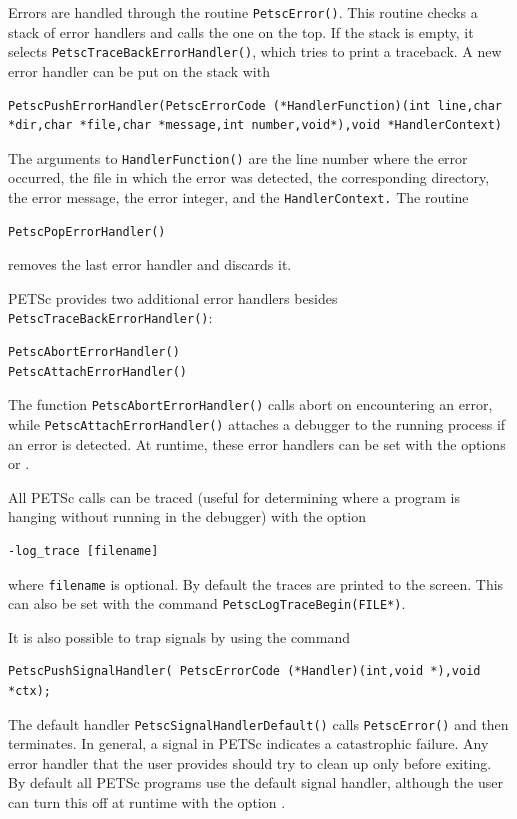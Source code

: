 {{{Errors are handled through the routine \lstinline{PetscError()}.
This routine
checks a stack of error handlers and calls the one on the top.
If the stack is empty, it selects \lstinline{PetscTraceBackErrorHandler()},
which tries to print a traceback.
A new error handler can be put on the stack with
\begin{lstlisting}
PetscPushErrorHandler(PetscErrorCode (*HandlerFunction)(int line,char *dir,char *file,char *message,int number,void*),void *HandlerContext)
\end{lstlisting}
The arguments to \lstinline{HandlerFunction()} are the line number where
the error occurred, the file in which the error was detected, the corresponding
directory, the error message, the error integer, and the \lstinline{HandlerContext.}
The routine
\begin{lstlisting}
PetscPopErrorHandler()
\end{lstlisting}
removes the last error handler and discards it.

PETSc provides two additional error handlers besides
\lstinline{PetscTraceBackErrorHandler()}:
\begin{lstlisting}
PetscAbortErrorHandler()
PetscAttachErrorHandler()
\end{lstlisting}
The function \lstinline{PetscAbortErrorHandler()} calls abort on encountering an error, while
\break\lstinline{PetscAttachErrorHandler()} attaches a debugger to the running process
if an error is detected. At runtime, these error handlers can be set
with the options  or   .

All PETSc calls can be traced (useful for determining where a program is
hanging without running in the debugger) with the option
\begin{lstlisting}
-log_trace [filename]
\end{lstlisting}
where \lstinline{filename} is optional. By default the traces are printed to the
screen.  This can also be set with the
command \lstinline{PetscLogTraceBegin(FILE*)}. 

It is also possible to trap signals by using the 
command
\begin{lstlisting}
PetscPushSignalHandler( PetscErrorCode (*Handler)(int,void *),void *ctx);
\end{lstlisting}
The default handler \lstinline{PetscSignalHandlerDefault()}
calls
\lstinline{PetscError()} and then terminates. In general, a signal in PETSc
indicates a catastrophic failure.  Any error handler that the user provides
should try to clean up only before exiting.  By default all PETSc programs
use the default signal handler, although the user can turn this off
at runtime with the
option  .

}}}
